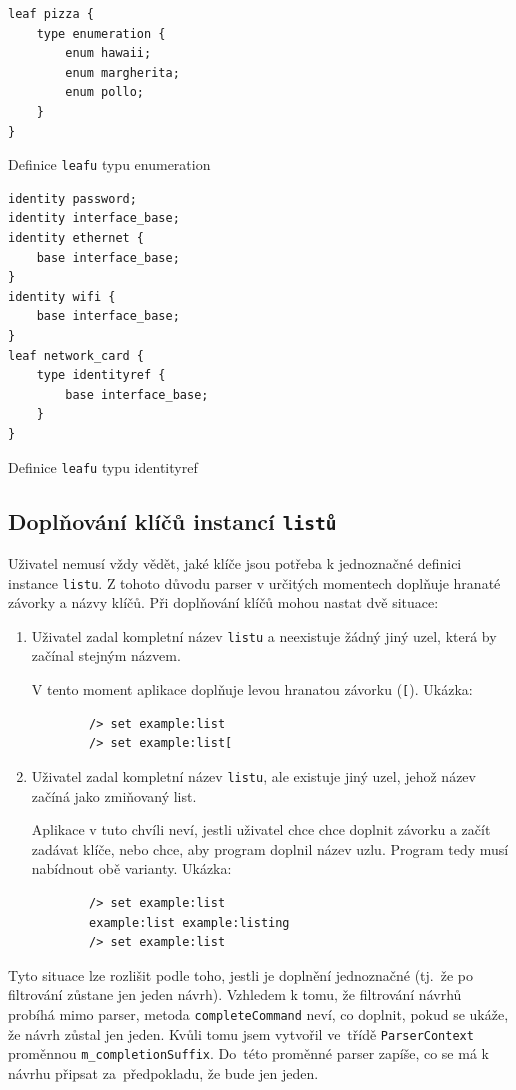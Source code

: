 \documentclass[thesis=B,czech,hidelinks]{FITthesis}[2019/03/06]
\begin{document}
\begin{listing}[H]
        \begin{verbatim}
leaf pizza {
    type enumeration {
        enum hawaii;
        enum margherita;
        enum pollo;
    }
}
\end{verbatim}
\caption{Definice \texttt{leafu} typu enumeration}\label{leaf:enum}
\end{listing}

\begin{listing}[H]
\begin{verbatim}
identity password;
identity interface_base;
identity ethernet {
    base interface_base;
}
identity wifi {
    base interface_base;
}
leaf network_card {
    type identityref {
        base interface_base;
    }
}
\end{verbatim}
\caption{Definice \texttt{leafu} typu identityref}\label{leaf:identityref}
\end{listing}



\subsection{Doplňování klíčů instancí \texttt{listů}}
Uživatel nemusí vždy vědět, jaké klíče jsou potřeba k jednoznačné definici instance \texttt{listu}. Z tohoto důvodu parser v určitých momentech doplňuje hranaté závorky a názvy klíčů. Při doplňování klíčů mohou nastat dvě situace:

\begin{enumerate}
    \item Uživatel zadal kompletní název \texttt{listu} a neexistuje žádný jiný uzel, která by začínal stejným názvem.

        V tento moment aplikace doplňuje levou hranatou závorku (\verb¨[¨). Ukázka:
        \begin{verbatim}
        /> set example:list
        /> set example:list[
        \end{verbatim}

    \item Uživatel zadal kompletní název \texttt{listu}, ale existuje jiný uzel, jehož název začíná jako zmiňovaný list.

        Aplikace v tuto chvíli neví, jestli uživatel chce chce doplnit závorku a začít zadávat klíče, nebo chce, aby program doplnil název uzlu. Program tedy musí nabídnout obě varianty. Ukázka:
        \begin{verbatim}
        /> set example:list
        example:list example:listing
        /> set example:list
        \end{verbatim}

\end{enumerate}
Tyto situace lze rozlišit podle toho, jestli je doplnění jednoznačné (tj.\ že po filtrování zůstane jen jeden návrh). Vzhledem k tomu, že filtrování návrhů probíhá mimo parser, metoda \texttt{completeCommand} neví, co doplnit, pokud se ukáže, že návrh zůstal jen jeden. Kvůli tomu jsem vytvořil ve~třídě \texttt{ParserContext} proměnnou \texttt{m\_completionSuffix}. Do~této proměnné parser zapíše, co se má k návrhu připsat za~předpokladu, že bude jen jeden.
\end{document}
